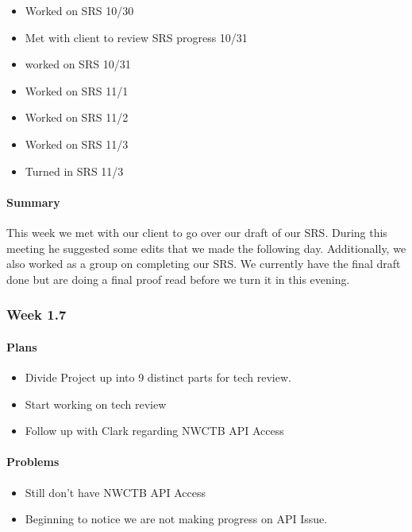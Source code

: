 \documentclass[onecolumn, draftclsnofoot,10pt, compsoc]{article}
\begin{document}
		        \begin{itemize}
		            \item Worked on SRS 10/30
		            \item Met with client to review SRS progress 10/31
		            \item worked on SRS 10/31
		            \item Worked on SRS 11/1
		            \item Worked on SRS 11/2
		            \item Worked on SRS 11/3
		            \item Turned in SRS 11/3
		        \end{itemize}
		
		    \paragraph{Summary} \hfill \break
		        This week we met with our client to go over our draft of our SRS. During this meeting he suggested some edits that we made the following day. Additionally, we also worked as a group on completing our SRS. We currently have the final draft done but are doing a final proof read before we turn it in this evening.\\
		
		\subsubsection{Week 1.7}
		
		    \paragraph{Plans} \hfill \break
		        \begin{itemize}
		            \item Divide Project up into 9 distinct parts for tech review.
		            \item Start working on tech review
		            \item Follow up with Clark regarding NWCTB API Access
		        \end{itemize}
		
		    \paragraph{Problems} \hfill \break
		        \begin{itemize}
		            \item Still don't have NWCTB API Access
		            \item Beginning to notice we are not making progress on API Issue.
		        \end{itemize}
		
\end{document}
